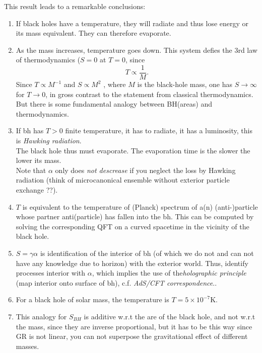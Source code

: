 	This result leads to a remarkable conclusions:
	\begin{enumerate}
		\item  If black holes have a
	temperature, they will radiate and thus lose energy or its mass equivalent. They can therefore evaporate.
	
	\item As the mass increases, temperature goes down. This system defies the 3rd law of thermodynamics ($S=0$ at $T=0$, since
	\begin{equation}
		T \propto \frac{1}{M}.
	\end{equation}
	Since $T ∝ M^{−1}$ and $S ∝ M^2$ , where $M$ is the black-hole mass, one has $S → ∞$ for $T → 0$, in
	gross contrast to the statement from classical thermodynamics.\\
	But there is some fundamental analogy between BH(areas) and thermodynamics.
	\item If bh has $T>0$ finite temperature, it has to radiate, it has a luminosity, this is  \emph{Hawking radiation}.\\
	The black hole thus must evaporate. The evaporation time is the slower the lower its mass.\\
	Note that $\alpha$ only does \emph{not descrease} if you neglect the loss by Hawking radiation (think of microcanonical ensemble without exterior particle exchange ??).
	
	\item $T$ is equivalent to the temperature of (Planck) spectrum of a(n) (anti-)particle whose partner anti(particle) has fallen into the bh. This can be computed by solving the corresponding QFT on a curved spacetime in the vicinity of the black hole.
	\item $S=\gamma \alpha$ is identification of the interior of bh (of which we do not and can not have any knowledge due to horizon) with the exterior world. Thus, identify processes interior with $\alpha$, which implies the use of the\emph{holographic principle} (map interior onto surface of bh), c.f. \emph{AdS/CFT correspondence}..
	 \item For a black hole of solar mass, the temperature is $T=5\times 10^{-7} \mathrm{K}$.
	 \item This analogy for $S_{BH}$ is additive w.r.t the are of the black hole, and not w.r.t the mass, since they are inverse proportional, but it has to be this way since GR is not linear, you can not superpose the gravitational effect of different masses.
\end{enumerate}
	
